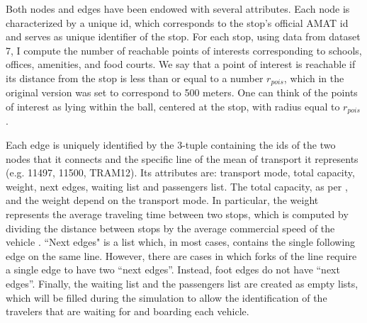 Both nodes and edges have been endowed with several attributes.
Each node is characterized by a unique id, which corresponds to the stop's official AMAT id and serves as unique identifier of the stop. For each stop, using data from dataset 7, I compute the number of reachable points of interests corresponding to schools, offices, amenities, and food courts. We say that a point of interest is reachable if its distance from the stop is less than or equal to a number $r_{pois}$, which in the original version was set to correspond to 500 meters. One can think of the points of interest as lying within the ball, centered at the stop, with radius equal to $r_{pois}$.  
 
Each edge is uniquely identified by the 3-tuple containing the ids of the two nodes that it connects and the specific line of the mean of transport it represents (e.g. 11497, 11500, TRAM12). Its attributes are: transport mode, total capacity, weight, next edges, waiting list and passengers list. The total capacity, as per \cite{site13,site14,site15,site16}, and the weight depend on the transport mode. In particular, the weight represents the average traveling time between two stops, which is computed by dividing the distance between stops by the average commercial speed of the vehicle \cite{site17}. ``Next edges" is a list which, in most cases, contains the single following edge on the same line. However, there are cases in which forks of the line require a single edge to have two “next edges”. Instead, foot edges do not have “next edges”. Finally, the waiting list and the passengers list are created as empty lists, which will be filled during the simulation to allow the identification of the travelers that are waiting for and boarding each vehicle. 


